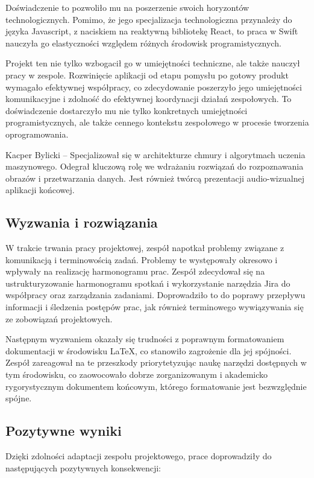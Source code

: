 \documentclass[12pt, a4paper, twoside, openany]{book}
\newcommand{\forceindent}{\leavevmode{\parindent=1.3em\indent}}
\begin{document}
{Doświadczenie to pozwoliło mu na poszerzenie swoich horyzontów technologicznych. Pomimo, że jego specjalizacja technologiczna przynależy do języka Javascript, z naciskiem na reaktywną bibliotekę React, to praca w Swift nauczyła go elastyczności względem różnych środowisk programistycznych.

Projekt ten nie tylko wzbogacił go w umiejętności techniczne, ale także nauczył pracy w zespole. Rozwinięcie aplikacji od etapu pomysłu po gotowy produkt wymagało efektywnej współpracy, co zdecydowanie poszerzyło jego umiejętności komunikacyjne i zdolność do efektywnej koordynacji działań zespołowych. To doświadczenie dostarczyło mu nie tylko konkretnych umiejętności programistycznych, ale także cennego kontekstu zespołowego w procesie tworzenia oprogramowania.

Kacper Bylicki -- Specjalizował się w architekturze chmury i algorytmach uczenia maszynowego. Odegrał kluczową rolę we wdrażaniu rozwiązań do rozpoznawania obrazów i przetwarzania danych. Jest również twórcą prezentacji audio-wizualnej aplikacji końcowej.

\subsection{Wyzwania i rozwiązania}

\forceindent W trakcie trwania pracy projektowej, zespół napotkał problemy związane z komunikacją i terminowością zadań. Problemy te występowały okresowo i wpływały na realizację harmonogramu prac. Zespół zdecydował się na ustrukturyzowanie harmonogramu spotkań i wykorzystanie narzędzia Jira do współpracy oraz zarządzania zadaniami. Doprowadziło to do poprawy przepływu informacji i śledzenia postępów prac, jak również terminowego wywiązywania się ze zobowiązań projektowych.

Następnym wyzwaniem okazały się trudności z poprawnym formatowaniem dokumentacji w środowisku LaTeX, co stanowiło zagrożenie dla jej spójności. Zespół zareagował na te przeszkody priorytetyzując naukę narzędzi dostępnych w tym środowisku, co zaowocowało dobrze zorganizowanym i akademicko rygorystycznym dokumentem końcowym, którego formatowanie jest bezwzględnie spójne.

\subsection{Pozytywne wyniki}

\forceindent Dzięki zdolności adaptacji zespołu projektowego, prace doprowadziły do następujących pozytywnych konsekwencji:

}
\end{document}
